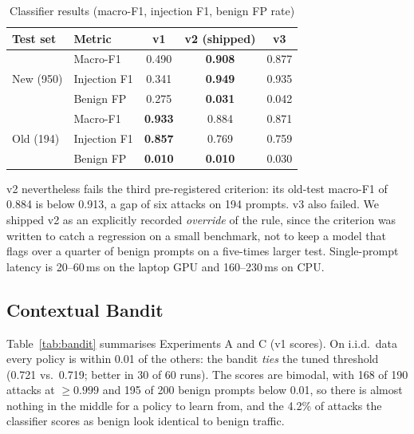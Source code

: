 \documentclass[conference]{IEEEtran}
\begin{document}
\begin{table}[t]
\caption{Classifier results (macro-F1, injection F1, benign FP rate)}
\label{tab:clf}
\centering
\footnotesize
\setlength{\tabcolsep}{4pt}
\begin{tabular}{llccc}
\toprule
Test set & Metric & v1 & v2 (shipped) & v3 \\
\midrule
\multirow{3}{*}{New (950)} & Macro-F1 & 0.490 & \textbf{0.908} & 0.877 \\
 & Injection F1 & 0.341 & \textbf{0.949} & 0.935 \\
 & Benign FP & 0.275 & \textbf{0.031} & 0.042 \\
\midrule
\multirow{3}{*}{Old (194)} & Macro-F1 & \textbf{0.933} & 0.884 & 0.871 \\
 & Injection F1 & \textbf{0.857} & 0.769 & 0.759 \\
 & Benign FP & \textbf{0.010} & \textbf{0.010} & 0.030 \\
\bottomrule
\end{tabular}
\end{table}

v2 nevertheless fails the third pre-registered criterion: its old-test
macro-F1 of 0.884 is below 0.913, a gap of six attacks on 194 prompts. v3
also failed. We shipped v2 as an explicitly recorded \emph{override} of the
rule, since the criterion was written to catch a regression on a small
benchmark, not to keep a model that flags over a quarter of benign
prompts on a five-times larger test. Single-prompt latency is 20--60\,ms on
the laptop GPU and 160--230\,ms on CPU.

\subsection{Contextual Bandit}

Table~\ref{tab:bandit} summarises Experiments A and C (v1 scores). On
i.i.d.\ data every policy is within 0.01 of the others: the bandit
\emph{ties} the tuned threshold (0.721 vs.\ 0.719; better in 30 of 60
runs). The scores are bimodal, with 168 of 190 attacks at $\ge0.999$ and
195 of 200 benign prompts below 0.01, so there is almost nothing in the
middle for a policy to learn from, and the 4.2\% of attacks the classifier
scores as benign look identical to benign traffic.
\end{document}
